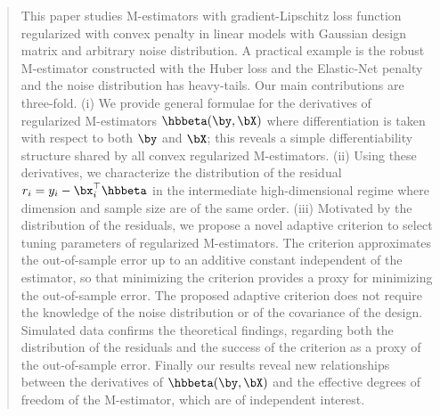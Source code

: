 \documentclass{colt2022} %
\title
[Derivatives and residual distribution of regularized M-estimators]
{Derivatives and residual distribution of regularized M-estimators 
with application to adaptive tuning}
\numberwithin{equation}{section}
\begin{document}
\maketitle

\begin{abstract}
    This paper studies M-estimators with gradient-Lipschitz loss function
    regularized with convex penalty
    in linear models with Gaussian design matrix
    and arbitrary noise distribution.
    A practical example is the robust M-estimator constructed with
    the Huber loss and the Elastic-Net penalty 
    and the noise distribution has heavy-tails.
    Our main contributions are three-fold.
    (i)
    We provide general formulae for the derivatives of regularized
    M-estimators $\hbbeta(\by,\bX)$ where differentiation is
    taken with respect to both $\by$ and $\bX$; this reveals
    a simple differentiability structure shared by all convex regularized
    M-estimators.
    (ii)
    Using these derivatives, we characterize the distribution
    of the residual $r_i  = y_i-\bx_i^\top\hbbeta$
    in the intermediate high-dimensional regime where dimension and sample
    size are of the same order.
    (iii)
    Motivated by the distribution of the residuals, we propose
    a novel adaptive criterion to select tuning parameters
    of regularized M-estimators. The criterion approximates
    the out-of-sample error up to an additive constant independent 
    of the estimator,
    so that minimizing the criterion provides a proxy for minimizing the
    out-of-sample error.
    The proposed adaptive criterion does not require the knowledge
    of the noise distribution or of
    the covariance of the design.
    Simulated data confirms the theoretical findings, regarding
    both the distribution of the residuals and the success
    of the criterion as a proxy of the out-of-sample error.
    Finally our results reveal new relationships between the derivatives
    of $\hbbeta(\by,\bX)$ and the effective degrees of freedom
    of the M-estimator, which are of independent interest.


\end{abstract}
\end{document}
